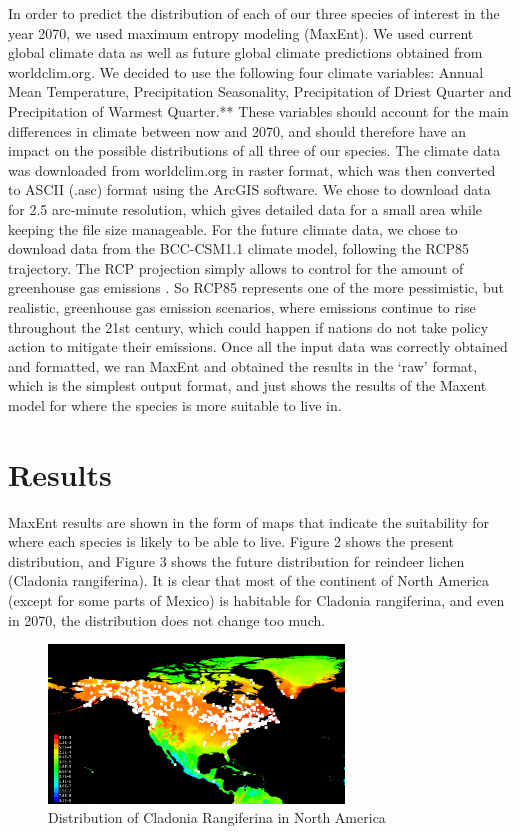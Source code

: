 \documentclass[twoside]{article}
\begin{document}
\indent In order to predict the distribution of each of our three species of interest
in the year 2070, we used maximum entropy modeling (MaxEnt). We used current
global climate data as well as future global climate predictions obtained
from worldclim.org. We decided to use the following four climate variables:
Annual Mean Temperature, Precipitation Seasonality, Precipitation of Driest
Quarter and Precipitation of Warmest Quarter.** These variables should account
for the main differences in climate between now and 2070, and should therefore
have an impact on the possible distributions of all three of our species.
The climate data was downloaded from worldclim.org in raster format, which was
then converted to ASCII (.asc) format using the ArcGIS software. We chose to
download data for 2.5 arc-minute resolution, which gives detailed data for a
small area while keeping the file size manageable. For the future climate data,
we chose to download data from the BCC-CSM1.1 climate model, following the
RCP85 trajectory. The RCP projection simply allows to control for the amount
of greenhouse gas emissions \cite{ipcc}. So RCP85 represents one of the more
pessimistic, but realistic, greenhouse gas emission scenarios, where emissions
continue to rise throughout the 21st century, which could happen if nations
do not take policy action to mitigate their emissions. Once all the input data
was correctly obtained and formatted, we ran MaxEnt and obtained the results
in the ‘raw’ format, which is the simplest output format, and just shows the
results of the Maxent model for where the species is more suitable to live in.


\section{Results}
\indent MaxEnt results are shown in the form of maps that indicate the suitability
for where each species is likely to be able to live. Figure 2 shows the
present distribution, and Figure 3 shows the future distribution for
reindeer lichen (Cladonia rangiferina). It is clear that most of the
continent of North America (except for some parts of Mexico) is habitable
for Cladonia rangiferina, and even in 2070, the distribution does not change
too much. \\
\begin{figure}[H]
\centering
\includegraphics[width=0.7\textwidth]{NCladoniaPresent}
\caption{Distribution of Cladonia Rangiferina in North America}
\end{figure}
\end{document}
